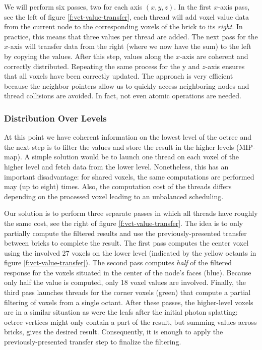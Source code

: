 We will perform six passes, two for each axis $(x,y,z)$. In the first $x$-axis pass, see the left of figure \ref{f:vct-value-transfer}, each thread will add voxel value data from the current node to the corresponding voxels of the brick to its \textit{right}. In practice, this means that three values per thread are added. The next pass for the $x$-axis will transfer data from the right (where we now have the sum) to the left by copying the values. After this step, values along the $x$-axis are coherent and correctly distributed. Repeating the same process for the y and $z$-axis ensures that all voxels have been correctly updated. The approach is very efficient because the neighbor pointers allow us to quickly access neighboring nodes and thread collisions are avoided. In fact, not even atomic operations are needed.




\subsubsection{Distribution Over Levels}
At this point we have coherent information on the lowest level of the octree and the next step is to filter the values and store the result in the higher levels (MIP-map). A simple solution would be to launch one thread on each voxel of the higher level and fetch data from the lower level. Nonetheless, this has an important disadvantage: for shared voxels, the same computations are performed may (up to eight) times. Also, the computation cost of the threads differs depending on the processed voxel leading to an unbalanced scheduling.

Our solution is to perform three separate passes in which all threads have roughly the same cost, see the right of figure \ref{f:vct-value-transfer}. The idea is to only partially compute the filtered results and use the previously-presented transfer between bricks to complete the result. The first pass computes the center voxel using the involved 27 voxels on the lower level (indicated by the yellow octants in figure \ref{f:vct-value-transfer}). The second pass computes \textit{half} of the filtered response for the voxels situated in the center of the node's faces (blue). Because only half the value is computed, only 18 voxel values are involved. Finally, the third pass launches threads for the corner voxels (green) that compute a partial filtering of voxels from a single octant. After these passes, the higher-level voxels are in a similar situation as were the leafs after the initial photon splatting: octree vertices might only contain a part of the result, but summing values across bricks, gives the desired result. Consequently, it is enough to apply the previously-presented transfer step to finalize the filtering.


